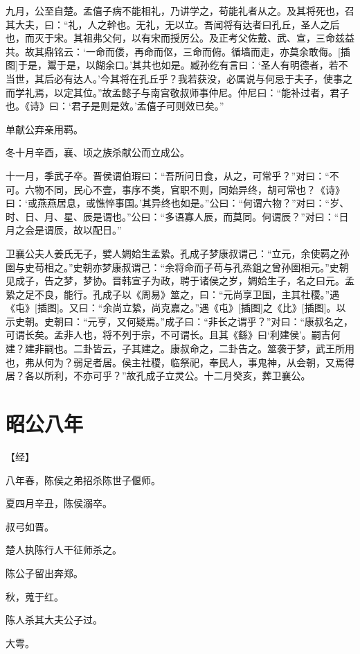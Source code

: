 \documentclass[a4paper,12pt,UTF8,twoside]{ctexbook}
\begin{document}
九月，公至自楚。孟僖子病不能相礼，乃讲学之，苟能礼者从之。及其将死也，召其大夫，曰：“礼，人之幹也。无礼，无以立。吾闻将有达者曰孔丘，圣人之后也，而灭于宋。其祖弗父何，以有宋而授厉公。及正考父佐戴、武、宣，三命兹益共。故其鼎铭云：‘一命而偻，再命而伛，三命而俯。循墙而走，亦莫余敢侮。[插图]于是，鬻于是，以餬余口。’其共也如是。臧孙纥有言曰：‘圣人有明德者，若不当世，其后必有达人。’今其将在孔丘乎？我若获没，必属说与何忌于夫子，使事之而学礼焉，以定其位。”故孟懿子与南宫敬叔师事仲尼。仲尼曰：“能补过者，君子也。《诗》曰：‘君子是则是效。’孟僖子可则效已矣。”

单献公弃亲用羁。

冬十月辛酉，襄、顷之族杀献公而立成公。

十一月，季武子卒。晋侯谓伯瑕曰：“吾所问日食，从之，可常乎？”对曰：“不可。六物不同，民心不壹，事序不类，官职不则，同始异终，胡可常也？《诗》曰：‘或燕燕居息，或憔悴事国。’其异终也如是。”公曰：“何谓六物？”对曰：“岁、时、日、月、星、辰是谓也。”公曰：“多语寡人辰，而莫同。何谓辰？”对曰：“日月之会是谓辰，故以配日。”

卫襄公夫人姜氏无子，嬖人婤姶生孟絷。孔成子梦康叔谓己：“立元，余使羁之孙圉与史苟相之。”史朝亦梦康叔谓己：“余将命而子苟与孔烝鉏之曾孙圉相元。”史朝见成子，告之梦，梦协。晋韩宣子为政，聘于诸侯之岁，婤姶生子，名之曰元。孟絷之足不良，能行。孔成子以《周易》筮之，曰：“元尚享卫国，主其社稷。”遇《屯》[插图]。又曰：“余尚立絷，尚克嘉之。”遇《屯》[插图]之《比》[插图]。以示史朝。史朝曰：“元亨，又何疑焉。”成子曰：“非长之谓乎？”对曰：“康叔名之，可谓长矣。孟非人也，将不列于宗，不可谓长。且其《繇》曰‘利建侯’。嗣吉何建？建非嗣也。二卦皆云，子其建之。康叔命之，二卦告之。筮袭于梦，武王所用也，弗从何为？弱足者居。侯主社稷，临祭祀，奉民人，事鬼神，从会朝，又焉得居？各以所利，不亦可乎？”故孔成子立灵公。十二月癸亥，葬卫襄公。

\section{昭公八年}




【经】

八年春，陈侯之弟招杀陈世子偃师。

夏四月辛丑，陈侯溺卒。

叔弓如晋。

楚人执陈行人干征师杀之。

陈公子留出奔郑。

秋，蒐于红。

陈人杀其大夫公子过。

大雩。
\end{document}
